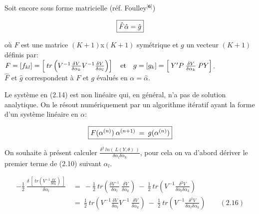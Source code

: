 \documentclass[12pt,fleqn]{book} %
\begin{document}
\vspace{1em}

Soit encore sous forme matricielle (réf. Foulley$^\textbf{[6]}$)

\begin{equation}
\fbox{$
\hat{F}\hat{\alpha}=\hat{g}
$}
\end{equation}

\vspace{0.5em}

où $F$ est une matrice $(K+1)$x$(K+1)$ symétrique et $g$ un vecteur $(K+1)$ définis par:\\ 
$F=[f_{kl}]=\left[\:tr\left(V^{-1} \frac{ \delta V }{\delta \alpha_k}  V^{-1} \frac{ \delta V} {\delta \alpha_l}\right) \right] \quad\textnormal{et}\quad g=[g_k]=\left[\:Y'P\:\frac{ \delta V }{\delta \alpha_k}\: P Y\right]$.\\
$\hat{F}$ et $\hat{g}$ correspondent à $F$ et $g$ évalués en $\alpha=\hat{\alpha}$.

\vspace{2em}

Le système en (2.14) est non linéaire qui, en général, n'a pas de solution analytique. On le résout numériquement par un algorithme itératif ayant la forme d'un système linéaire en $\alpha$:

\begin{equation}
\fbox{$
F(\alpha^{(n)})\:\alpha^{(n+1)}\:=\:g(\alpha^{(n)})
$}
\end{equation}


\newpage



On souhaite à présent calculer $\frac{\delta^2 \: ln( \:\textit{L}(Y,\theta)\:) }{\delta \alpha_l \delta \alpha_k} $, pour cela on va d'abord dériver le premier terme de (2.10) suivant $\alpha_l$.

\begin{align*}
 - \frac{1}{2}  \: \frac{ \delta \: \left[ \: tr\left( V^{-1} \frac{ \delta V }{\delta \alpha_k} \right) \: \right] }{\delta \alpha_l } \: &= \:  -\frac{1}{2} \: tr\left( \frac{\delta V^{-1}}{\delta \alpha_l}\:  \frac{ \delta V }{\delta \alpha_k} \right)  \:-\: \frac{1}{2} \: tr\left( V^{-1} \frac{ \delta^2 V }{\delta \alpha_l \delta \alpha_k} \right)\\
 	&= \:  \frac{1}{2} \: tr\left( V^{-1} \frac{ \delta V }{\delta \alpha_l} V^{-1}\:  \frac{ \delta V }{\delta \alpha_k} \right)  \:-\: \frac{1}{2} \: tr\left( V^{-1} \frac{ \delta^2 V }{\delta \alpha_l \delta \alpha_k} \right) \quad\quad (2.16)
\end{align*}
\end{document}
